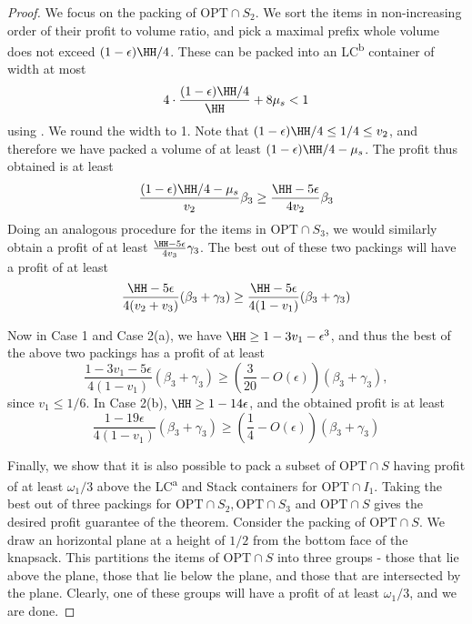 \begin{proof}
    We focus on the packing of $\text{OPT}\cap S_2$. We sort the items in non-increasing order of their profit to volume ratio, and pick a maximal prefix whole volume does not exceed $(1-\epsilon)\HH/4$. These can be packed into an LC\textsuperscript{b} container of width at most
    \[4\cdot \frac{(1-\epsilon)\HH/4}{\HH}+8\mu_s <1\]
    using . We round the width to 1. Note that $(1-\epsilon)\HH/4 \le 1/4\le v_2$, and therefore we have packed a volume of at least $(1-\epsilon)\HH/4 - \mu_s$. The profit thus obtained is at least 
    \[ \frac{(1-\epsilon)\HH/4 - \mu_s}{v_2}\beta_3 \ge \frac{\HH-5\epsilon}{4v_2}\beta_3\]
    Doing an analogous procedure for the items in $\text{OPT}\cap S_3$, we would similarly obtain a profit of at least $\frac{\HH-5\epsilon}{4v_3}\gamma_3$. The best out of these two packings will have a profit of at least 
    \[ \frac{\HH -5\epsilon}{4(v_2+v_3)}(\beta_3+\gamma_3) \ge \frac{\HH-5\epsilon}{4(1-v_1)}(\beta_3+\gamma_3)\]

    Now in Case 1 and Case 2(a), we have $\HH \ge 1-3v_1-\epsilon^3$, and thus the best of the above two packings has a profit of at least
    \[ \frac{1-3v_1-5\epsilon}{4(1-v_1)}(\beta_3+\gamma_3) \ge \left(\frac{3}{20}-O(\epsilon)\right)(\beta_3+\gamma_3),\]
    since $v_1\le 1/6$. In Case 2(b), $\HH \ge 1-14\epsilon$, and the obtained profit is at least 
    \[ \frac{1-19\epsilon}{4(1-v_1)}(\beta_3+\gamma_3) \ge \left(\frac{1}{4}-O(\epsilon)\right)(\beta_3+\gamma_3)\]

    Finally, we show that it is also possible to pack a subset of $\text{OPT}\cap S$ having profit of at least $\omega_1/3$ above the LC\textsuperscript{a} and Stack containers for $\text{OPT}\cap I_1$. Taking the best out of three packings for $\text{OPT}\cap S_2, \text{OPT}\cap S_3$ and $\text{OPT}\cap S$ gives the desired profit guarantee of the theorem.  Consider the packing of $\text{OPT}\cap S$. We draw an horizontal plane at a height of $1/2$ from the bottom face of the knapsack. This partitions the items of $\text{OPT}\cap S$ into three groups - those that lie above the plane, those that lie below the plane, and those that are intersected by the plane. Clearly, one of these groups will have a profit of at least $\omega_1/3$, and we are done.
    
    
\end{proof}
\fi
